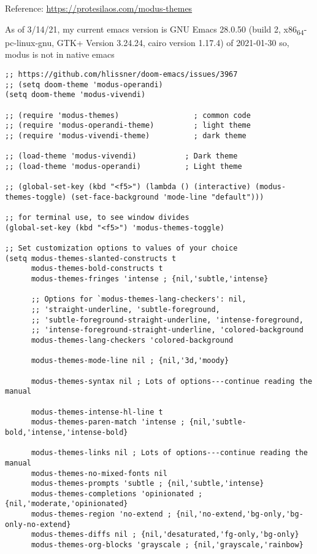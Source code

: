 \documentclass[8pt]{article}
\begin{document}
Reference: \url{https://protesilaos.com/modus-themes}

As of 3/14/21, my current emacs version is
GNU Emacs 28.0.50 (build 2, x86\textsubscript{64}-pc-linux-gnu, GTK+ Version 3.24.24, cairo version 1.17.4) of 2021-01-30
so, modus is not in native emacs

\begin{verbatim}
;; https://github.com/hlissner/doom-emacs/issues/3967
;; (setq doom-theme 'modus-operandi)
(setq doom-theme 'modus-vivendi)

;; (require 'modus-themes)                 ; common code
;; (require 'modus-operandi-theme)         ; light theme
;; (require 'modus-vivendi-theme)          ; dark theme

;; (load-theme 'modus-vivendi)           ; Dark theme
;; (load-theme 'modus-operandi)          ; Light theme

;; (global-set-key (kbd "<f5>") (lambda () (interactive) (modus-themes-toggle) (set-face-background 'mode-line "default")))

;; for terminal use, to see window divides
(global-set-key (kbd "<f5>") 'modus-themes-toggle)

;; Set customization options to values of your choice
(setq modus-themes-slanted-constructs t
      modus-themes-bold-constructs t
      modus-themes-fringes 'intense ; {nil,'subtle,'intense}

      ;; Options for `modus-themes-lang-checkers': nil,
      ;; 'straight-underline, 'subtle-foreground,
      ;; 'subtle-foreground-straight-underline, 'intense-foreground,
      ;; 'intense-foreground-straight-underline, 'colored-background
      modus-themes-lang-checkers 'colored-background

      modus-themes-mode-line nil ; {nil,'3d,'moody}

      modus-themes-syntax nil ; Lots of options---continue reading the manual

      modus-themes-intense-hl-line t
      modus-themes-paren-match 'intense ; {nil,'subtle-bold,'intense,'intense-bold}

      modus-themes-links nil ; Lots of options---continue reading the manual
      modus-themes-no-mixed-fonts nil
      modus-themes-prompts 'subtle ; {nil,'subtle,'intense}
      modus-themes-completions 'opinionated ; {nil,'moderate,'opinionated}
      modus-themes-region 'no-extend ; {nil,'no-extend,'bg-only,'bg-only-no-extend}
      modus-themes-diffs nil ; {nil,'desaturated,'fg-only,'bg-only}
      modus-themes-org-blocks 'grayscale ; {nil,'grayscale,'rainbow}


\end{verbatim}
\end{document}

